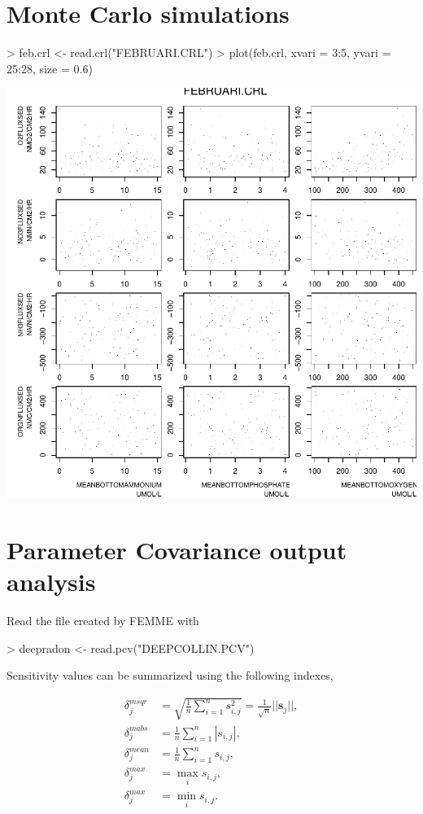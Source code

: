 \documentclass{scrartcl}
\begin{document}
\section{Monte Carlo simulations}

\begin{Schunk}
\begin{Sinput}
> feb.crl <- read.crl("FEBRUARI.CRL")
> plot(feb.crl, xvari = 3:5, yvari = 25:28, size = 0.6)
\end{Sinput}
\end{Schunk}
\includegraphics{figures/f-montecarlo}
\section{Parameter Covariance output analysis}


Read the file created by FEMME with
 


\begin{Schunk}
\begin{Sinput}
> deepradon <- read.pcv("DEEPCOLLIN.PCV")
\end{Sinput}
\end{Schunk}
Sensitivity values can be summarized using the following indexes,

\begin{align}
  \delta^{msqr}_j&
  =\sqrt{\frac{1}{n}\sum_{i=1}^n{s^2_{i,j}}}=\frac{1}{\sqrt{n}}||\mathbf{s}_j||,
  \label{eq:msqr}\\
  \delta^{mabs}_j& =\frac{1}{n}\sum_{i=1}^n{|s_{i,j}|},\label{eq:mabs}\\
  \delta^{mean}_j& =\frac{1}{n}\sum_{i=1}^n{s_{i,j}},\label{eq:mean}\\
  \delta^{max}_j& =\max_i s_{i,j},\label{eq:max}\\
  \delta^{max}_j& =\min_i s_{i,j}. \label{eq:min}
\end{align}
\end{document}
